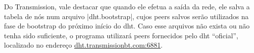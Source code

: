 Do Transmission, vale destacar que quando ele efetua a saída da rede, ele salva a tabela
de nós num arquivo \sverb|dht.bootstrap|, cujos \glspl*{peer} salvos serão utilizados na
fase de \gls*{bootstrap} do próximo início do \gls*{dht}. Caso esse arquivos não exista
ou não tenha sido suficiente, o programa utilizará \glspl*{peer} fornecidos pelo
\gls*{dht} ``oficial'', localizado no endereço \url{dht.transmissionbt.com:6881}.
